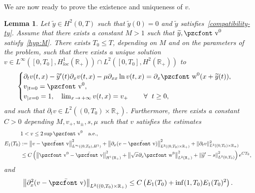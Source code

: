 \documentclass[10pt]{amsart}
\newtheorem{lemm}[theo]{Lemma}\newtheorem{prop}[theo]{Proposition}\newtheorem{coro}[theo]{Corollary}\newtheorem{conj}[theo]{Conjecture}
\theoremstyle{definition}\newtheorem{defi}[theo]{Definition}\newtheorem{rema}[theo]{Remark}\newtheorem{exam}[theo]{Example}\newtheorem{exem}[theo]{Example}\newtheorem{nota}[theo]{Notation}
\newcommand{\mathpzc}[1]{\text{\pzcfont #1}}
\newcommand{\R}{\mathbb{R}}
\newcommand{\p}{\partial}
\newcommand{\bv}{\bar{\mathpzc{v}}}
\newcommand{\tv}{\mathpzc{v}}
\newcommand{\tw}{\mathpzc{w}}
\newcommand{\ty}{\widetilde{y}}
\let\oldforall\forall
\renewcommand*{\forall}{\mathrel{\oldforall}}
\begin{document}
We are now ready to prove the existence and uniqueness of $v$.


\begin{lemm}\label{lem:WP-vn}
Let $\ty\in H^2(0,T)$ such that $\ty(0)=0$ and $\ty$ satisfies~\eqref{compatibility-ty}. Assume that there exists a constant $M>1$ such that $\ty, \tv^0$ satisfy~\eqref{hyp:M}. There exists $T_0\leq T$, depending on $M$ and on the parameters of the problem, such that there exists a unique solution $v \in L^\infty([0,T_0], H^1_{loc}(\R_+))\cap L^2([0,T_0], H^2(\R_+))$ to
\begin{equation}\label{eq:v}
\begin{cases}
\partial_t v(t,x) -\ty'(t) \partial_x v(t,x) - \mu \partial_{xx} \ln v(t,x) = \partial_x \tw^0(x+\ty(t)), \\
v_{|t=0}=\tv^0,\\
v_{|x=0}=1,\quad \lim_{x\,\to\,+\infty} v(t,x) = v_+ \qquad \forall \ t \geq 0,
\end{cases}
\end{equation}
and such that $\p_t v \in L^2((0,T_0)\times \R_+)$. Furthermore, there exists a constant $C>0$ depending $M, v_+, u_\pm, s,\mu$ such that $v$ satisfies the estimates
\begin{align}
& 1 <v\leq 2 \sup \tv^0\quad \text{a.e.},\\
E_1(T_0) &:= \left\|v-\bv\right\|_{L^\infty((0,T_0), H^1)}^2 + \left\|\p_x (v-\bv)\right\|_{L^2((0,T_0)\times \R_+)}^2 + \|\p_t v\|_{L^2 ((0,T_0)\times \R_+)}^2\nonumber\\
&\leq C\left(\left\|\tv^0 -\bv\right\|_{H^1(\R_+)}^2 + \left\|\sqrt{x} \partial_x\tw^0\right\|_{L^2(\R_+)}^2 + \left\|\ty'-s\right\|_{L^2(0,T_0)}^2\right) e^{CT_0}, \label{est:H1-v}
\end{align}
and
\[
\left\|\p_x^2 (v-\bv)\right\|_{L^2((0,T_0)\times \R_+)}\leq C \left(E_1(T_0) + \inf(1, T_0)E_1(T_0)^2\right).
\]
\end{lemm}
\end{document}
